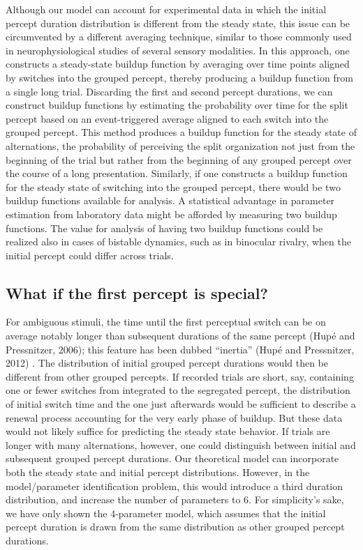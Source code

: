 Although our model can account for experimental data in which the initial percept duration distribution is different from the steady state, this issue can be circumvented by a different averaging technique, similar to those commonly used in neurophysiological studies of several sensory modalities. In this approach, one constructs a steady-state buildup function by averaging over time points aligned by switches into the grouped percept, thereby producing a buildup function from a single long trial. Discarding the first and second percept durations, we can construct buildup functions by estimating the probability over time for the split percept based on an event-triggered average aligned to each switch into the grouped percept. This method produces a buildup function for the steady state of alternations, the probability of perceiving the split organization not just from the beginning of the trial but rather from the beginning of any grouped percept over the course of a long presentation. Similarly, if one constructs a buildup function for the steady state of switching into the grouped percept, there would be two buildup functions available for analysis. A statistical advantage in parameter estimation from laboratory data might be afforded by measuring two buildup functions. The value for analysis of having two buildup functions could be realized also in cases of bistable dynamics, such as in binocular rivalry, when the initial percept could differ across trials. 

\subsection{What if the first percept is special?}

For ambiguous stimuli, the time until the first perceptual switch can be on average notably longer than subsequent durations of the same percept (Hupé and Pressnitzer, 2006); this feature has been dubbed “inertia” (Hupé and Pressnitzer, 2012) . The distribution of initial grouped percept durations would then be different from other grouped percepts. If recorded trials are short, say, containing one or fewer switches from integrated to the segregated percept, the distribution of initial switch time and the one just afterwards would be sufficient to describe a renewal process accounting for the very early phase of buildup.  But these data would not likely suffice for predicting the steady state behavior. If trials are longer with many alternations, however, one could distinguish between initial and subsequent grouped percept durations. Our theoretical model can incorporate both the steady state and initial percept distributions. However, in the model/parameter identification problem, this would introduce a third duration distribution, and increase the number of parameters to 6. For simplicity’s sake, we have only shown the 4-parameter model, which assumes that the initial percept duration is drawn from the same distribution as other grouped percept durations.

